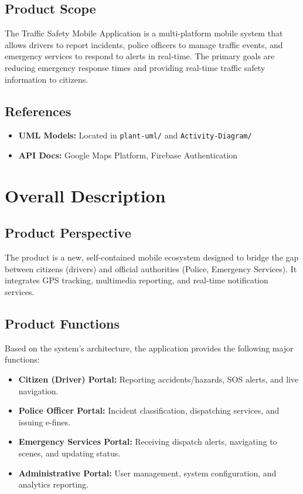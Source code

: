 \documentclass[11pt,a4paper]{article}
\begin{document}
\subsection{Product Scope}
The Traffic Safety Mobile Application is a multi-platform mobile system that allows drivers to report incidents, police officers to manage traffic events, and emergency services to respond to alerts in real-time. The primary goals are reducing emergency response times and providing real-time traffic safety information to citizens.

\subsection{References}
\begin{itemize}
    \item \textbf{UML Models:} Located in \texttt{plant-uml/} and \texttt{Activity-Diagram/}
    \item \textbf{API Docs:} Google Maps Platform, Firebase Authentication
\end{itemize}

\section{Overall Description}

\subsection{Product Perspective}
The product is a new, self-contained mobile ecosystem designed to bridge the gap between citizens (drivers) and official authorities (Police, Emergency Services). It integrates GPS tracking, multimedia reporting, and real-time notification services.

\subsection{Product Functions}
Based on the system's architecture, the application provides the following major functions:
\begin{itemize}
    \item \textbf{Citizen (Driver) Portal:} Reporting accidents/hazards, SOS alerts, and live navigation.
    \item \textbf{Police Officer Portal:} Incident classification, dispatching services, and issuing e-fines.
    \item \textbf{Emergency Services Portal:} Receiving dispatch alerts, navigating to scenes, and updating status.
    \item \textbf{Administrative Portal:} User management, system configuration, and analytics reporting.
\end{itemize}
\end{document}

